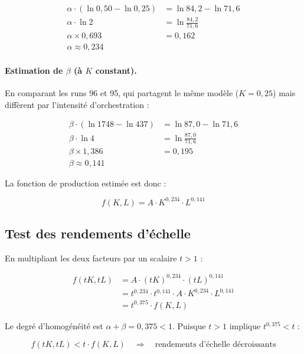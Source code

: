 \begin{align}
\alpha \cdot (\ln 0{,}50 - \ln 0{,}25) &= \ln 84{,}2 - \ln 71{,}6 \\
\alpha \cdot \ln 2 &= \ln \frac{84{,}2}{71{,}6} \\
\alpha \times 0{,}693 &= 0{,}162 \\
\boxed{\alpha \approx 0{,}234}
\end{align}

\paragraph{Estimation de $\beta$ (à $K$ constant).} En comparant les runs 96 et 95, qui partagent le même modèle ($K = 0{,}25$) mais diffèrent par l'intensité d'orchestration :

\begin{align}
\beta \cdot (\ln 1748 - \ln 437) &= \ln 87{,}0 - \ln 71{,}6 \\
\beta \cdot \ln 4 &= \ln \frac{87{,}0}{71{,}6} \\
\beta \times 1{,}386 &= 0{,}195 \\
\boxed{\beta \approx 0{,}141}
\end{align}

La fonction de production estimée est donc :

\begin{equation}
\boxed{f(K, L) = A \cdot K^{0,234} \cdot L^{0,141}}
\end{equation}

\subsection{Test des rendements d'échelle}

En multipliant les deux facteurs par un scalaire $t > 1$ :

\begin{align}
f(tK, tL) &= A \cdot (tK)^{0,234} \cdot (tL)^{0,141} \\
           &= t^{0,234} \cdot t^{0,141} \cdot A \cdot K^{0,234} \cdot L^{0,141} \\
           &= t^{0,375} \cdot f(K, L)
\end{align}

Le degré d'homogénéité est $\alpha + \beta = 0{,}375 < 1$. Puisque $t > 1$ implique $t^{0,375} < t$ :

\begin{equation}
\boxed{f(tK, tL) < t \cdot f(K, L) \quad \Longrightarrow \quad \text{rendements d'échelle décroissants}}
\end{equation}

